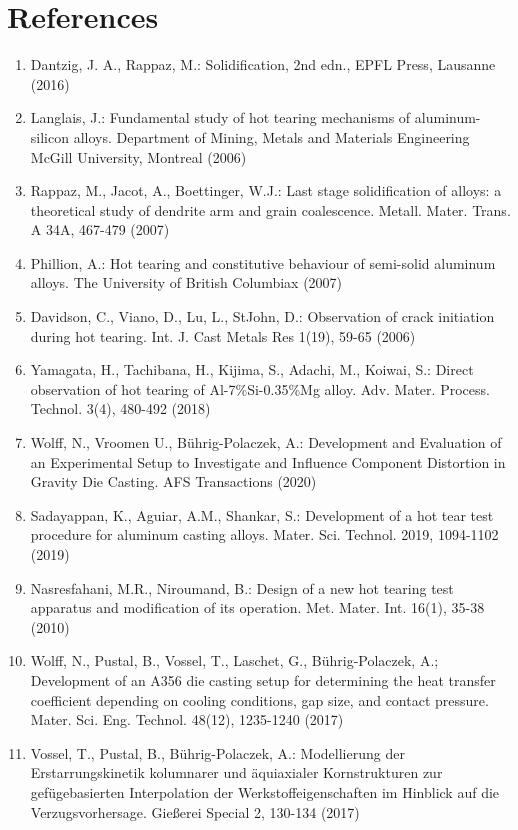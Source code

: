\documentclass[10pt]{article}
\begin{document}
\section*{References}
\begin{enumerate}
  \item Dantzig, J. A., Rappaz, M.: Solidification, 2nd edn., EPFL Press, Lausanne (2016)

  \item Langlais, J.: Fundamental study of hot tearing mechanisms of aluminum-silicon alloys. Department of Mining, Metals and Materials Engineering McGill University, Montreal (2006)

  \item Rappaz, M., Jacot, A., Boettinger, W.J.: Last stage solidification of alloys: a theoretical study of dendrite arm and grain coalescence. Metall. Mater. Trans. A 34A, 467-479 (2007)

  \item Phillion, A.: Hot tearing and constitutive behaviour of semi-solid aluminum alloys. The University of British Columbiax (2007)

  \item Davidson, C., Viano, D., Lu, L., StJohn, D.: Observation of crack initiation during hot tearing. Int. J. Cast Metals Res 1(19), 59-65 (2006)

  \item Yamagata, H., Tachibana, H., Kijima, S., Adachi, M., Koiwai, S.: Direct observation of hot tearing of Al-7\%Si-0.35\%Mg alloy. Adv. Mater. Process. Technol. 3(4), 480-492 (2018)

  \item Wolff, N., Vroomen U., Bührig-Polaczek, A.: Development and Evaluation of an Experimental Setup to Investigate and Influence Component Distortion in Gravity Die Casting. AFS Transactions (2020)

  \item Sadayappan, K., Aguiar, A.M., Shankar, S.: Development of a hot tear test procedure for aluminum casting alloys. Mater. Sci. Technol. 2019, 1094-1102 (2019)

  \item Nasresfahani, M.R., Niroumand, B.: Design of a new hot tearing test apparatus and modification of its operation. Met. Mater. Int. 16(1), 35-38 (2010)

  \item Wolff, N., Pustal, B., Vossel, T., Laschet, G., Bührig-Polaczek, A.; Development of an A356 die casting setup for determining the heat transfer coefficient depending on cooling conditions, gap size, and contact pressure. Mater. Sci. Eng. Technol. 48(12), 1235-1240 (2017)

  \item Vossel, T., Pustal, B., Bührig-Polaczek, A.: Modellierung der Erstarrungskinetik kolumnarer und äquiaxialer Kornstrukturen zur gefügebasierten Interpolation der Werkstoffeigenschaften im Hinblick auf die Verzugsvorhersage. Gießerei Special 2, 130-134 (2017)

\end{enumerate}
\end{document}
